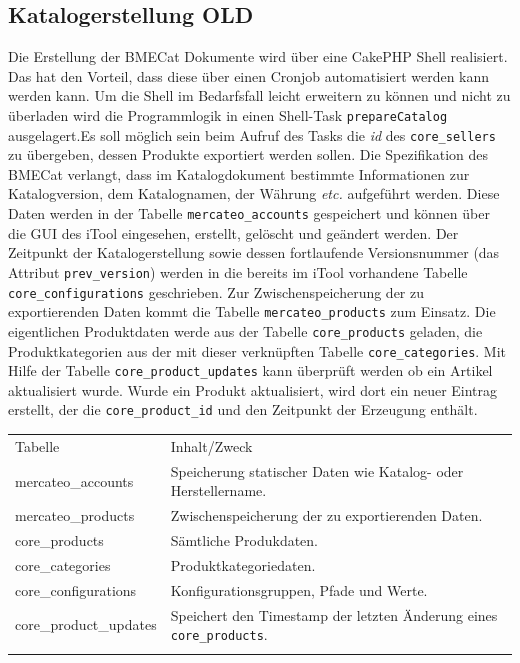 	
	
		
	
	
	
	\subsection{Katalogerstellung OLD}
	
	Die Erstellung der BMECat Dokumente wird über eine CakePHP Shell realisiert. Das hat den Vorteil, dass diese über einen Cronjob automatisiert werden kann werden kann. Um die Shell im Bedarfsfall leicht erweitern zu können und nicht zu überladen wird die Programmlogik in einen Shell-Task \texttt{prepareCatalog} ausgelagert.Es soll möglich sein beim Aufruf des Tasks die \textit{id} des \texttt{core\_sellers} zu übergeben, dessen Produkte exportiert werden sollen. Die Spezifikation des BMECat verlangt, dass im Katalogdokument bestimmte Informationen zur Katalogversion, dem Katalognamen, der Währung \textit{etc.} aufgeführt werden. Diese Daten werden in der Tabelle \texttt{mercateo\_accounts} gespeichert und können über die GUI des iTool eingesehen, erstellt, gelöscht und geändert werden. Der Zeitpunkt der Katalogerstellung sowie dessen fortlaufende Versionsnummer (das Attribut \texttt{prev\_version}) werden in die bereits im iTool vorhandene Tabelle \texttt{core\_configurations} geschrieben. Zur Zwischenspeicherung der zu exportierenden Daten kommt die Tabelle \texttt{mercateo\_products} zum Einsatz. Die eigentlichen Produktdaten werde aus der Tabelle \texttt{core\_products} geladen, die Produktkategorien aus der mit dieser verknüpften Tabelle \texttt{core\_categories}. Mit Hilfe der Tabelle \texttt{core\_product\_updates} kann überprüft werden ob ein Artikel aktualisiert wurde. Wurde ein Produkt aktualisiert, wird dort ein neuer Eintrag erstellt, der die \texttt{core\_product\_id} und den Zeitpunkt der Erzeugung enthält.
	

	
	
	\begin{table}[!htbp]
		\begin{tabularx}{\textwidth}{p{3.8cm} X  }
			\rowcolor[HTML]{EFEFEF} 
			Tabelle & Inhalt/Zweck  \\ \cline{1-2} \addlinespace[7pt]
			mercateo\_accounts & Speicherung statischer Daten wie Katalog- oder Herstellername. \\
			mercateo\_products & Zwischenspeicherung der zu exportierenden Daten.  \\
			core\_products & Sämtliche Produkdaten. \\
			core\_categories & Produktkategoriedaten. \\
			core\_configurations & Konfigurationsgruppen, Pfade und Werte. \\ 
			core\_product\_updates & Speichert den Timestamp der letzten Änderung eines \texttt{core\_products}. \\ \addlinespace[7pt] \cline{1-2} 	
	
		\end{tabularx}%
	\end{table}
		\pagebreak
